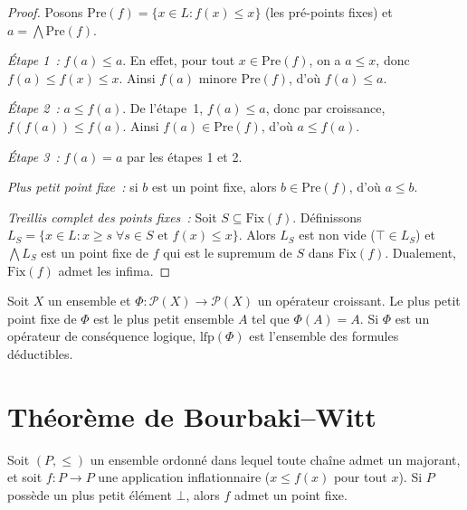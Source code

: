 \begin{proof}
Posons $\mathrm{Pre}(f) = \{x \in L : f(x) \leq x\}$ (les pr\'e-points fixes) et
$a = \bigwedge \mathrm{Pre}(f)$.

\emph{\'Etape 1~:} $f(a) \leq a$. En effet, pour tout $x \in \mathrm{Pre}(f)$, on a
$a \leq x$, donc $f(a) \leq f(x) \leq x$. Ainsi $f(a)$ minore $\mathrm{Pre}(f)$,
d'o\`u $f(a) \leq a$.

\emph{\'Etape 2~:} $a \leq f(a)$. De l'\'etape~1, $f(a) \leq a$, donc par croissance,
$f(f(a)) \leq f(a)$. Ainsi $f(a) \in \mathrm{Pre}(f)$, d'o\`u $a \leq f(a)$.

\emph{\'Etape 3~:} $f(a) = a$ par les \'etapes 1 et 2.

\emph{Plus petit point fixe~:} si $b$ est un point fixe, alors $b \in \mathrm{Pre}(f)$,
d'o\`u $a \leq b$.

\emph{Treillis complet des points fixes~:} Soit $S \subseteq \mathrm{Fix}(f)$. D\'efinissons
$L_S = \{x \in L : x \geq s \; \forall s \in S \text{ et } f(x) \leq x\}$. Alors
$L_S$ est non vide ($\top \in L_S$) et $\bigwedge L_S$ est un point fixe de $f$ qui est
le supremum de $S$ dans $\mathrm{Fix}(f)$. Dualement, $\mathrm{Fix}(f)$ admet les infima.
\end{proof}

\begin{exemple}
Soit $X$ un ensemble et $\Phi\colon \mathcal{P}(X) \to \mathcal{P}(X)$ un op\'erateur
croissant. Le plus petit point fixe de $\Phi$ est le plus petit ensemble $A$ tel que
$\Phi(A) = A$. Si $\Phi$ est un op\'erateur de cons\'equence logique, $\mathrm{lfp}(\Phi)$
est l'ensemble des formules d\'eductibles.
\end{exemple}

\section{Th\'eor\`eme de Bourbaki--Witt}

\begin{theoreme}
\label{thm:bourbaki-witt}
Soit $(P, \leq)$ un ensemble ordonn\'e dans lequel toute cha\^ine admet un majorant, et
soit $f\colon P \to P$ une application inflationnaire ($x \leq f(x)$ pour tout $x$). Si
$P$ poss\`ede un plus petit \'el\'ement $\bot$, alors $f$ admet un point fixe.
\end{theoreme}


